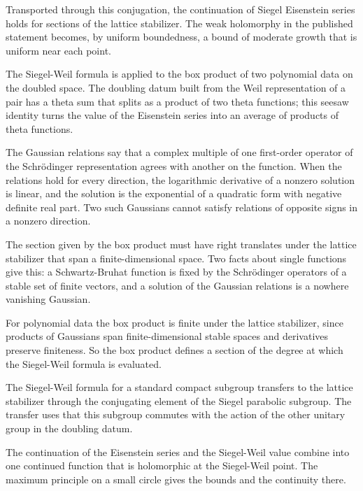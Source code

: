 Transported through this conjugation, the continuation of Siegel Eisenstein
series holds for sections of the lattice stabilizer. The weak holomorphy in the
published statement becomes, by uniform boundedness, a bound of moderate growth
that is uniform near each point.

The Siegel-Weil formula is applied to the box product of two polynomial data on
the doubled space. The doubling datum built from the Weil representation of a
pair has a theta sum that splits as a product of two theta functions; this
seesaw identity turns the value of the Eisenstein series into an average of
products of theta functions.

The Gaussian relations say that a complex multiple of one first-order operator
of the Schrödinger representation agrees with another on the function. When
the relations hold for every direction, the logarithmic derivative of a nonzero
solution is linear, and the solution is the exponential of a quadratic form
with negative definite real part. Two such Gaussians cannot satisfy relations
of opposite signs in a nonzero direction.

The section given by the box product must have right translates under the
lattice stabilizer that span a finite-dimensional space. Two facts about single
functions give this: a Schwartz-Bruhat function is fixed by the Schrödinger
operators of a stable set of finite vectors, and a solution of the Gaussian
relations is a nowhere vanishing Gaussian.

For polynomial data the box product is finite under the lattice stabilizer,
since products of Gaussians span finite-dimensional stable spaces and
derivatives preserve finiteness. So the box product defines a section of the
degree at which the Siegel-Weil formula is evaluated.

The Siegel-Weil formula for a standard compact subgroup transfers to the lattice
stabilizer through the conjugating element of the Siegel parabolic subgroup.
The transfer uses that this subgroup commutes with the action of the other
unitary group in the doubling datum.

The continuation of the Eisenstein series and the Siegel-Weil value combine into
one continued function that is holomorphic at the Siegel-Weil point. The
maximum principle on a small circle gives the bounds and the continuity there.

